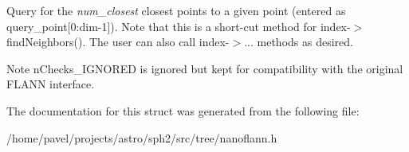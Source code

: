 Query for the {\itshape num\+\_\+closest} closest points to a given point (entered as query\+\_\+point\mbox{[}0\+:dim-\/1\mbox{]}). Note that this is a short-\/cut method for index-\/$>$find\+Neighbors(). The user can also call index-\/$>$... methods as desired. \begin{DoxyNote}{Note}
n\+Checks\+\_\+\+I\+G\+N\+O\+R\+ED is ignored but kept for compatibility with the original F\+L\+A\+NN interface. 
\end{DoxyNote}


The documentation for this struct was generated from the following file\+:\begin{DoxyCompactItemize}
\item 
/home/pavel/projects/astro/sph2/src/tree/nanoflann.\+h\end{DoxyCompactItemize}
